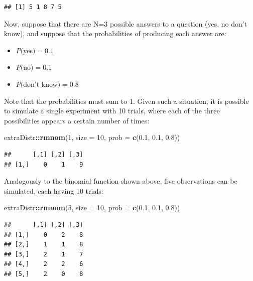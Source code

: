 \documentclass[12pt,]{krantz}
\newenvironment{Shaded}{\begin{snugshade}}{\end{snugshade}}
\newcommand{\KeywordTok}[1]{\textcolor[rgb]{0.13,0.29,0.53}{\textbf{#1}}}
\newcommand{\DataTypeTok}[1]{\textcolor[rgb]{0.13,0.29,0.53}{#1}}
\newcommand{\DecValTok}[1]{\textcolor[rgb]{0.00,0.00,0.81}{#1}}
\newcommand{\FloatTok}[1]{\textcolor[rgb]{0.00,0.00,0.81}{#1}}
\newcommand{\OperatorTok}[1]{\textcolor[rgb]{0.81,0.36,0.00}{\textbf{#1}}}
\newcommand{\NormalTok}[1]{#1}
\providecommand{\tightlist}{%
  \setlength{\itemsep}{0pt}\setlength{\parskip}{0pt}}
\theoremstyle{definition}
\theoremstyle{definition}
\theoremstyle{definition}
\theoremstyle{remark}
\begin{document}
\begin{verbatim}
## [1] 5 1 8 7 5
\end{verbatim}

Now, suppose that there are N=3 possible answers to a question (yes, no
don't know), and suppose that the probabilities of producing each answer
are:

\begin{itemize}
\tightlist
\item
  \(P(\)yes\()=0.1\)
\item
  \(P(\)no\()=0.1\)
\item
  \(P(\)don't know\()=0.8\)
\end{itemize}

Note that the probabilities must sum to 1. Given such a situation, it is
possible to simulate a single experiment with 10 trials, where each of
the three possibilities appears a certain number of times:

\begin{Shaded}
\begin{Highlighting}[]
\NormalTok{extraDistr}\OperatorTok{::}\KeywordTok{rmnom}\NormalTok{(}\DecValTok{1}\NormalTok{, }\DataTypeTok{size =} \DecValTok{10}\NormalTok{, }\DataTypeTok{prob =} \KeywordTok{c}\NormalTok{(}\FloatTok{0.1}\NormalTok{, }\FloatTok{0.1}\NormalTok{, }\FloatTok{0.8}\NormalTok{))}
\end{Highlighting}
\end{Shaded}

\begin{verbatim}
##      [,1] [,2] [,3]
## [1,]    0    1    9
\end{verbatim}

Analogously to the binomial function shown above, five observations can
be simulated, each having 10 trials:

\begin{Shaded}
\begin{Highlighting}[]
\NormalTok{extraDistr}\OperatorTok{::}\KeywordTok{rmnom}\NormalTok{(}\DecValTok{5}\NormalTok{, }\DataTypeTok{size =} \DecValTok{10}\NormalTok{, }\DataTypeTok{prob =} \KeywordTok{c}\NormalTok{(}\FloatTok{0.1}\NormalTok{, }\FloatTok{0.1}\NormalTok{, }\FloatTok{0.8}\NormalTok{))}
\end{Highlighting}
\end{Shaded}

\begin{verbatim}
##      [,1] [,2] [,3]
## [1,]    0    2    8
## [2,]    1    1    8
## [3,]    2    1    7
## [4,]    2    2    6
## [5,]    2    0    8
\end{verbatim}
\end{document}
